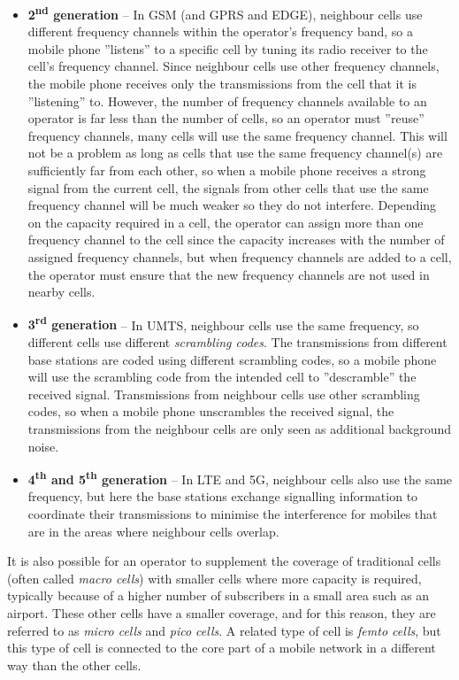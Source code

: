 \begin{itemize}
%
\item\textbf{2\textsuperscript{nd} generation} -- In GSM (and GPRS and EDGE), neighbour cells use different frequency channels within the operator's frequency band, so a mobile phone ''listens'' to a specific cell by tuning its radio receiver to the cell's frequency channel. Since neighbour cells use other frequency channels, the mobile phone receives only the transmissions from the cell that it is ''listening'' to. However, the number of frequency channels available to an operator is far less than the number of cells, so an operator must ''reuse'' frequency channels, \ie many cells will use the same frequency channel. This will not be a problem as long as cells that use the same frequency channel(s) are sufficiently far from each other, so when a mobile phone receives a strong signal from the current cell, the signals from other cells that use the same frequency channel will be much weaker so they do not interfere.  Depending on the capacity required in a cell, the operator can assign more than one frequency channel to the cell since the capacity increases with the number of assigned frequency channels, but when frequency channels are added to a cell, the operator must ensure that the new frequency channels are not used in nearby cells.
%
\item\textbf{3\textsuperscript{rd} generation} -- In UMTS, neighbour cells use the same frequency, so different cells use different \emph{scrambling codes}. The transmissions from different base stations are coded using different scrambling codes, so a mobile phone will use the scrambling code from the intended cell to ''descramble'' the received signal. Transmissions from neighbour cells use other scrambling codes, so when a mobile phone unscrambles the received signal, the transmissions from the neighbour cells are only seen as additional background noise.
%
\item\textbf{4\textsuperscript{th} and 5\textsuperscript{th} generation} -- In LTE and 5G, neighbour cells also use the same frequency, but here the base stations exchange signalling information to coordinate their transmissions to minimise the interference for mobiles that are in the areas where neighbour cells overlap.
\end{itemize}

It is also possible for an operator to supplement the coverage of traditional cells (often called \emph{macro cells}) with smaller cells where more capacity is required, typically because of a higher number of subscribers in a small area such as an airport. These other cells have a smaller coverage, and for this reason, they are referred to as \emph{micro cells} and \emph{pico cells}. A related type of cell is \emph{femto cells}, but this type of cell is connected to the core part of a mobile network in a different way than the other cells.

